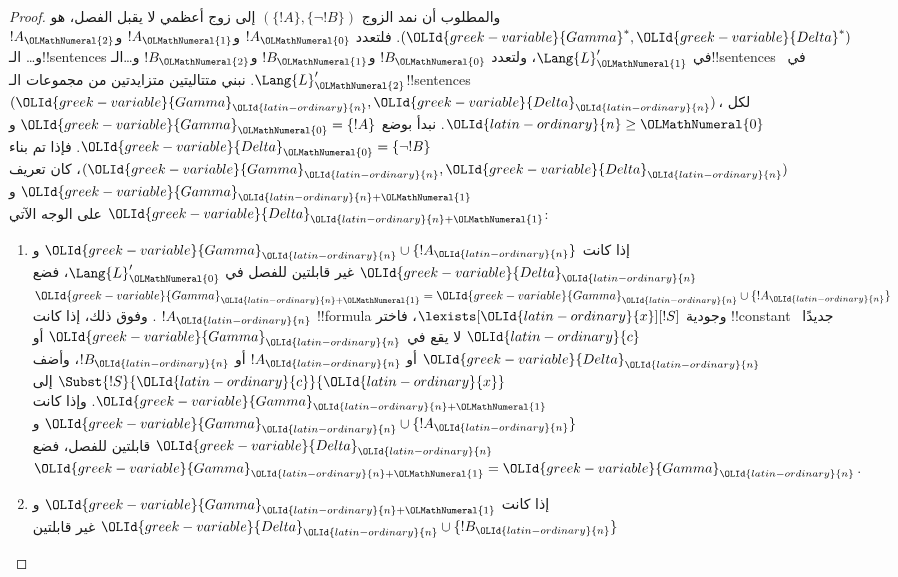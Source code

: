 \documentclass[../../../include/open-logic-section]{subfiles}
\begin{document}
\begin{proof}
والمطلوب أن نمد الزوج $(\{!A\},\{\lnot!B\})$ إلى زوج أعظمي لا يقبل الفصل،
هو $(\OLId{greek-variable}{Gamma}^*,\OLId{greek-variable}{Delta}^*)$. فلتعدد $!A_\OLMathNumeral{0}$ و$!A_\OLMathNumeral{1}$ و$!A_\OLMathNumeral{2}$ و\dots
الـ!!{sentence}s في $\Lang{L}'_\OLMathNumeral{1}$، ولتعدد $!B_\OLMathNumeral{0}$ و$!B_\OLMathNumeral{1}$ و$!B_\OLMathNumeral{2}$
و\dots الـ!!{sentence}s في~$\Lang{L}'_\OLMathNumeral{2}$. نبني متتاليتين متزايدتين من
مجموعات الـ!!{sentence}s $(\OLId{greek-variable}{Gamma}_\OLId{latin-ordinary}{n},\OLId{greek-variable}{Delta}_\OLId{latin-ordinary}{n})$، لكل $\OLId{latin-ordinary}{n} \ge \OLMathNumeral{0}$.
نبدأ بوضع $\OLId{greek-variable}{Gamma}_\OLMathNumeral{0}=\{!A\}$ و$\OLId{greek-variable}{Delta}_\OLMathNumeral{0}=\{\lnot !B\}$. فإذا تم بناء
$(\OLId{greek-variable}{Gamma}_\OLId{latin-ordinary}{n},\OLId{greek-variable}{Delta}_\OLId{latin-ordinary}{n})$، كان تعريف $\OLId{greek-variable}{Gamma}_{\OLId{latin-ordinary}{n}+\OLMathNumeral{1}}$ و$\OLId{greek-variable}{Delta}_{\OLId{latin-ordinary}{n}+\OLMathNumeral{1}}$
على الوجه الآتي:
\begin{enumerate}
\item إذا كانت $\OLId{greek-variable}{Gamma}_\OLId{latin-ordinary}{n} \cup \{!A_\OLId{latin-ordinary}{n}\}$ و$\OLId{greek-variable}{Delta}_\OLId{latin-ordinary}{n}$ غير قابلتين
  للفصل في $\Lang{L}'_\OLMathNumeral{0}$، فضع
  $\OLId{greek-variable}{Gamma}_{\OLId{latin-ordinary}{n}+\OLMathNumeral{1}}=\OLId{greek-variable}{Gamma}_\OLId{latin-ordinary}{n} \cup \{!A_\OLId{latin-ordinary}{n}\}$. وفوق ذلك، إذا كانت $!A_\OLId{latin-ordinary}{n}$
  !!{formula} وجودية $\lexists[\OLId{latin-ordinary}{x}][!S]$، فاختر !!{constant} جديدًا~$\OLId{latin-ordinary}{c}$
  لا يقع في $\OLId{greek-variable}{Gamma}_\OLId{latin-ordinary}{n}$ أو $\OLId{greek-variable}{Delta}_\OLId{latin-ordinary}{n}$ أو $!A_\OLId{latin-ordinary}{n}$ أو $!B_\OLId{latin-ordinary}{n}$، وأضف
  $\Subst{!S}{\OLId{latin-ordinary}{c}}{\OLId{latin-ordinary}{x}}$ إلى $\OLId{greek-variable}{Gamma}_{\OLId{latin-ordinary}{n}+\OLMathNumeral{1}}$. وإذا كانت
  $\OLId{greek-variable}{Gamma}_\OLId{latin-ordinary}{n} \cup \{!A_\OLId{latin-ordinary}{n}\}$ و$\OLId{greek-variable}{Delta}_\OLId{latin-ordinary}{n}$ قابلتين للفصل، فضع
  $\OLId{greek-variable}{Gamma}_{\OLId{latin-ordinary}{n}+\OLMathNumeral{1}}=\OLId{greek-variable}{Gamma}_\OLId{latin-ordinary}{n}$.
\item إذا كانت $\OLId{greek-variable}{Gamma}_{\OLId{latin-ordinary}{n}+\OLMathNumeral{1}}$ و$\OLId{greek-variable}{Delta}_\OLId{latin-ordinary}{n} \cup \{!B_\OLId{latin-ordinary}{n}\}$ غير قابلتين

\end{enumerate}
\end{proof}
\end{document}
